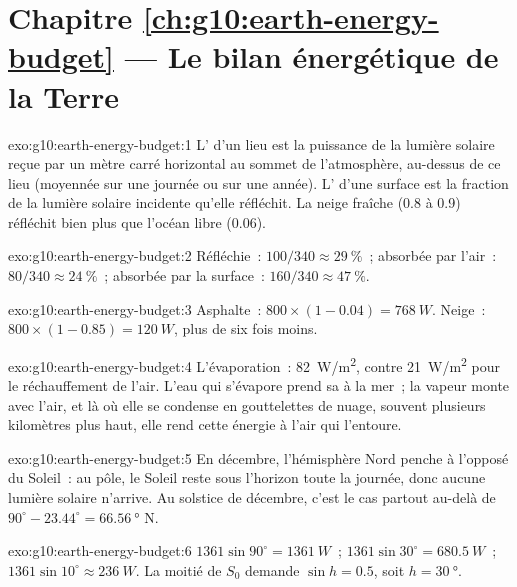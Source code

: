 \section*{Chapitre \ref{ch:g10:earth-energy-budget} --- Le bilan énergétique de la Terre}

\begin{solution}{exo:g10:earth-energy-budget:1}
L' d'un lieu est la puissance de la lumière solaire reçue par un
mètre carré horizontal au sommet de l'atmosphère, au-dessus de ce lieu
(moyennée sur une journée ou sur une année). L' d'une surface est la
fraction de la lumière solaire incidente qu'elle réfléchit. La neige fraîche
(0.8 à 0.9) réfléchit bien plus que l'océan libre (0.06).
\end{solution}

\begin{solution}{exo:g10:earth-energy-budget:2}
Réfléchie~: $100/340 \approx \qty{29}{\percent}$~; absorbée par l'air~:
$80/340 \approx \qty{24}{\percent}$~; absorbée par la surface~: $160/340
\approx \qty{47}{\percent}$.
\end{solution}

\begin{solution}{exo:g10:earth-energy-budget:3}
Asphalte~: $800 \times (1 - 0.04) = \qty{768}{W}$. Neige~: $800 \times (1 -
0.85) = \qty{120}{W}$, plus de six fois moins.
\end{solution}

\begin{solution}{exo:g10:earth-energy-budget:4}
L'évaporation~: \qty{82}{W/m^2}, contre \qty{21}{W/m^2} pour le
réchauffement de l'air. L'eau qui s'évapore prend sa  à la
mer~; la vapeur monte avec l'air, et là où elle se condense en gouttelettes
de nuage, souvent plusieurs kilomètres plus haut, elle rend cette énergie à
l'air qui l'entoure.
\end{solution}

\begin{solution}{exo:g10:earth-energy-budget:5}
En décembre, l'hémisphère Nord penche à l'opposé du Soleil~: au pôle, le
Soleil reste sous l'horizon toute la journée, donc aucune lumière solaire
n'arrive. Au solstice de décembre, c'est le cas partout au-delà de
$90^\circ - 23.44^\circ =
\qty{66.56}{\degree}$ N.
\end{solution}

\begin{solution}{exo:g10:earth-energy-budget:6}
$1361 \sin 90^\circ = \qty{1361}{W}$~; $1361 \sin 30^\circ =
\qty{680.5}{W}$~; $1361 \sin 10^\circ \approx \qty{236}{W}$. La moitié de
$S_0$ demande $\sin h = 0.5$, soit $h = \qty{30}{\degree}$.
\end{solution}


